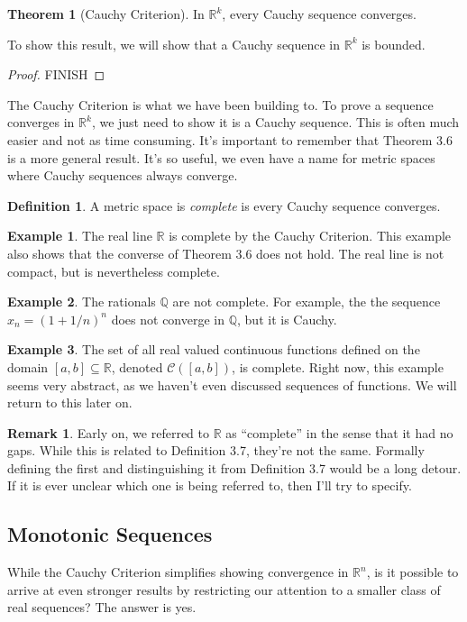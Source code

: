 \documentclass{article}
\newcommand{\R}{\mathbb{R}}
\newcommand{\Q}{\mathbb{Q}}
\theoremstyle{definition}
\newtheorem{theorem}{Theorem}[section]
\newtheorem{definition}{Definition}[section]
\newtheorem{example}{Example}[section]
\newtheorem{remark}{Remark}[section]
\begin{document}
\begin{theorem}[Cauchy Criterion]
	In $ \R^k $, every Cauchy sequence converges.
\end{theorem}
To show this result, we will show that a Cauchy sequence in $ \R^k $ is bounded. 
\begin{proof}
{\color{red}FINISH}
\end{proof}
The Cauchy Criterion is what we have been building to. To prove a sequence converges in $ \R^k $, we just need to show it is a Cauchy sequence. This is often much easier and not as time consuming. It's important to remember that Theorem 3.6 is a more general result. It's so useful, we even have a name for metric spaces where Cauchy sequences always converge.
\begin{definition}
	A metric space is \textit{\color{red}complete} is every Cauchy sequence converges. 
\end{definition}
\begin{example}
	The real line $ \R $ is complete by the Cauchy Criterion. This example also shows that the converse of Theorem 3.6 does not hold. The real line is not compact, but is nevertheless complete. 
\end{example}
\begin{example}
	The rationals $ \Q $ are not complete. For example, the the sequence $ x_n=(1+1/n)^n $ does not converge in $ \Q $, but it is Cauchy.
\end{example}
\begin{example}
	The set of all real valued continuous functions defined on the domain $ [a,b]\subseteq\R $, denoted $ \mathscr{C}([a,b]) $, is complete. Right now, this example seems very abstract, as we haven't even discussed sequences of functions. We will return to this later on.  
\end{example}
\begin{remark}
	Early on, we referred to $ \R $ as ``complete'' in the sense that it had no gaps. While this is related to Definition 3.7, they're not the same. Formally defining the first and distinguishing it from Definition 3.7 would be a long detour. If it is ever unclear which one is being referred to, then I'll try to specify. 
\end{remark}
\subsection{Monotonic Sequences}
While the Cauchy Criterion simplifies showing convergence in $ \R^n $, is it possible to arrive at even stronger results by restricting our attention to a smaller class of real sequences? The answer is yes. 
\end{document}

